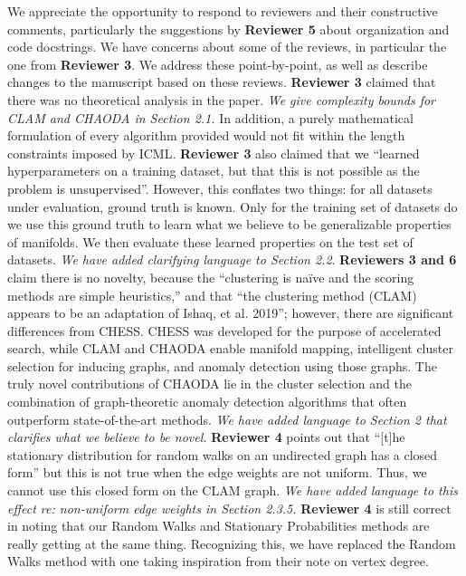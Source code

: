 \documentclass{article}
\begin{document}
\onecolumn
We appreciate the opportunity to respond to reviewers and their constructive comments, particularly the suggestions by \textbf{Reviewer 5} about organization and code docstrings.
We have concerns about some of the reviews, in particular the one from \textbf{Reviewer 3}.
We address these point-by-point, as well as describe changes to the manuscript based on these reviews.
\textbf{Reviewer 3} claimed that there was no theoretical analysis in the paper.
\emph{We give complexity bounds for CLAM and CHAODA in Section 2.1.}
In addition, a purely mathematical formulation of every algorithm provided would not fit within the length constraints imposed by ICML.
\textbf{Reviewer 3} also claimed that we ``learned hyperparameters on a training dataset, but that this is not possible as the problem is unsupervised''.
However, this conflates two things: for all datasets under evaluation, ground truth is known.
Only for the training set of datasets do we use this ground truth to learn what we believe to be generalizable properties of manifolds.
We then evaluate these learned properties on the test set of datasets.
\emph{We have added clarifying language to Section 2.2}.
\textbf{Reviewers 3 and 6} claim there is no novelty, because the ``clustering is na\"ive and the scoring methods are simple heuristics,'' and that ``the clustering method (CLAM) appears to be an adaptation of Ishaq, et al. 2019'';
however, there are significant differences from CHESS.
CHESS was developed for the purpose of accelerated search, while CLAM and CHAODA enable manifold mapping, intelligent cluster selection for inducing graphs, and anomaly detection using those graphs.
The truly novel contributions of CHAODA lie in the cluster selection and the combination of graph-theoretic anomaly detection algorithms that often outperform state-of-the-art methods.
\emph{We have added language to Section 2 that clarifies what we believe to be novel.}
\textbf{Reviewer 4} points out that ``[t]he stationary distribution for random walks on an undirected graph has a closed form'' but this is not true when the edge weights are not uniform.
Thus, we cannot use this closed form on the CLAM graph.
\emph{We have added language to this effect re: non-uniform edge weights in Section 2.3.5.}
\textbf{Reviewer 4} is still correct in noting that our Random Walks and Stationary Probabilities methods are really getting at the same thing.
Recognizing this, we have replaced the Random Walks method with one taking inspiration from their note on vertex degree.
\end{document}
